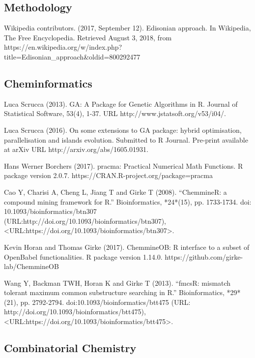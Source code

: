 \subsection{Methodology}

Wikipedia contributors. (2017, September 12). 
\newblock Edisonian approach. 
\newblock In Wikipedia, The Free Encyclopedia. Retrieved August 3, 2018, from  https://en.wikipedia.org/w/index.php?title=Edisonian_approach&oldid=800292477

\subsection{Cheminformatics}

Luca Scrucca (2013). 
\newblock GA: A Package for Genetic Algorithms in R. 
\newblock Journal of Statistical Software, 53(4), 1-37. URL http://www.jstatsoft.org/v53/i04/.

Luca Scrucca (2016). 
\newblock On some extensions to GA package: hybrid optimisation, parallelisation and islands evolution. Submitted to R Journal. 
\newblock Pre-print available at arXiv URL http://arxiv.org/abs/1605.01931.

Hans Werner Borchers (2017). 
\newblock pracma: Practical Numerical Math Functions. 
\newblock R package version 2.0.7. https://CRAN.R-project.org/package=pracma

Cao Y, Charisi A, Cheng L, Jiang T and Girke T (2008). 
\newblock “ChemmineR: a compound mining framework for R.”
\newblock Bioinformatics, *24*(15), pp. 1733-1734. doi: 10.1093/bioinformatics/btn307 (URL:http://doi.org/10.1093/bioinformatics/btn307), <URL:https://doi.org/10.1093/bioinformatics/btn307>.

Kevin Horan and Thomas Girke (2017). 
\newblock ChemmineOB: R interface to a subset of OpenBabel functionalities. 
\newblock R package version 1.14.0. https://github.com/girke-lab/ChemmineOB

 Wang Y, Backman TWH, Horan K and Girke T (2013). 
\newblock “fmcsR: mismatch tolerant maximum common substructure searching in R.” 
\newblock Bioinformatics, *29*(21), pp. 2792-2794. doi:10.1093/bioinformatics/btt475 (URL: http://doi.org/10.1093/bioinformatics/btt475), <URL:https://doi.org/10.1093/bioinformatics/btt475>.

\subsection{Combinatorial Chemistry}

